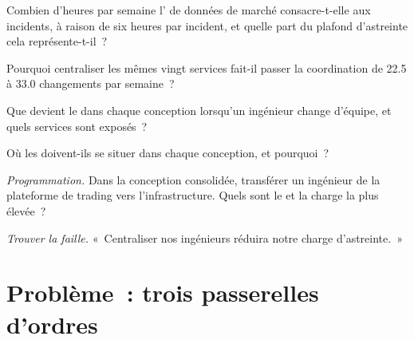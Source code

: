 \begin{exercise}[$\star$]\label{exo:fm:engineering-organisation-design:3}
Combien d'heures par semaine l' de données de marché consacre-t-elle aux incidents, à raison de six heures par incident, et quelle part du plafond d'astreinte cela représente-t-il~?
\end{exercise}

\begin{exercise}[$\star\star$]\label{exo:fm:engineering-organisation-design:4}
Pourquoi centraliser les mêmes vingt services fait-il passer la coordination de 22.5 à 33.0 changements par semaine~?
\end{exercise}

\begin{exercise}[$\star\star$]\label{exo:fm:engineering-organisation-design:5}
Que devient le  dans chaque conception lorsqu'un ingénieur change d'équipe, et quels services sont exposés~?
\end{exercise}

\begin{exercise}[$\star\star$]\label{exo:fm:engineering-organisation-design:6}
Où les  doivent-ils se situer dans chaque conception, et pourquoi~?
\end{exercise}

\begin{exercise}[$\star\star\star$]\label{exo:fm:engineering-organisation-design:7}
\emph{Programmation.} Dans la conception consolidée, transférer un ingénieur de la plateforme de trading vers l'infrastructure. Quels sont le  et la
charge la plus élevée~?
\end{exercise}

\begin{exercise}[$\star\star\star$]\label{exo:fm:engineering-organisation-design:8}
\emph{Trouver la faille.} «~Centraliser nos ingénieurs réduira notre charge d'astreinte.~»
\end{exercise}

\section{Problème~: trois passerelles d'ordres}

